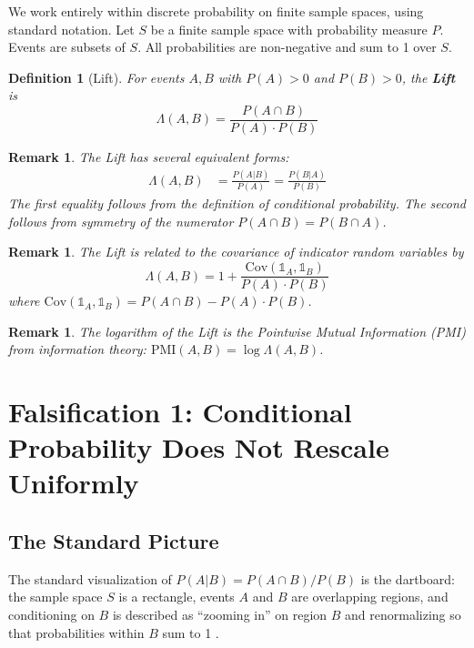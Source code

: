 \documentclass[12pt]{article}
\newtheorem{definition}[theorem]{Definition}
\newtheorem{remark}[theorem]{Remark}
\begin{document}
We work entirely within discrete probability on finite sample spaces, using standard notation. Let $S$ be a finite sample space with probability measure $P$. Events are subsets of $S$. All probabilities are non-negative and sum to 1 over $S$.

\begin{definition}[Lift]
For events $A, B$ with $P(A) > 0$ and $P(B) > 0$, the \textbf{Lift} is
\begin{equation}
\Lambda(A,B) = \frac{P(A \cap B)}{P(A) \cdot P(B)}
\end{equation}
\end{definition}

\begin{remark}
The Lift has several equivalent forms:
\begin{align}
\Lambda(A,B) &= \frac{P(A|B)}{P(A)} = \frac{P(B|A)}{P(B)} \label{eq:lift_conditional}
\end{align}
The first equality follows from the definition of conditional probability. The second follows from symmetry of the numerator $P(A \cap B) = P(B \cap A)$.
\end{remark}

\begin{remark}
The Lift is related to the covariance of indicator random variables by
\begin{equation}
\Lambda(A,B) = 1 + \frac{\mathrm{Cov}(\mathbb{1}_A, \mathbb{1}_B)}{P(A) \cdot P(B)} \label{eq:lift_cov}
\end{equation}
where $\mathrm{Cov}(\mathbb{1}_A, \mathbb{1}_B) = P(A \cap B) - P(A) \cdot P(B)$.
\end{remark}

\begin{remark}
The logarithm of the Lift is the Pointwise Mutual Information (PMI) from information theory:
$\mathrm{PMI}(A,B) = \log \Lambda(A,B)$.
\end{remark}

\section{Falsification 1: Conditional Probability Does Not Rescale Uniformly}

\subsection{The Standard Picture}

The standard visualization of $P(A|B) = P(A \cap B) / P(B)$ is the dartboard: the sample space $S$ is a rectangle, events $A$ and $B$ are overlapping regions, and conditioning on $B$ is described as ``zooming in'' on region $B$ and renormalizing so that probabilities within $B$ sum to 1 \cite{moitra2024}.
\end{document}
